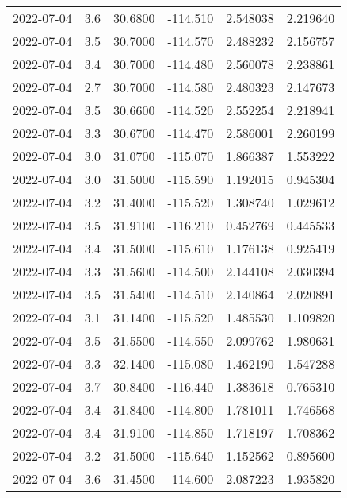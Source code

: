 \begin{tabular}{lrrrrr}
2022-07-04 &       3.6 &  30.6800 &  -114.510 &         2.548038 &         2.219640 \\
2022-07-04 &       3.5 &  30.7000 &  -114.570 &         2.488232 &         2.156757 \\
2022-07-04 &       3.4 &  30.7000 &  -114.480 &         2.560078 &         2.238861 \\
2022-07-04 &       2.7 &  30.7000 &  -114.580 &         2.480323 &         2.147673 \\
2022-07-04 &       3.5 &  30.6600 &  -114.520 &         2.552254 &         2.218941 \\
2022-07-04 &       3.3 &  30.6700 &  -114.470 &         2.586001 &         2.260199 \\
2022-07-04 &       3.0 &  31.0700 &  -115.070 &         1.866387 &         1.553222 \\
2022-07-04 &       3.0 &  31.5000 &  -115.590 &         1.192015 &         0.945304 \\
2022-07-04 &       3.2 &  31.4000 &  -115.520 &         1.308740 &         1.029612 \\
2022-07-04 &       3.5 &  31.9100 &  -116.210 &         0.452769 &         0.445533 \\
2022-07-04 &       3.4 &  31.5000 &  -115.610 &         1.176138 &         0.925419 \\
2022-07-04 &       3.3 &  31.5600 &  -114.500 &         2.144108 &         2.030394 \\
2022-07-04 &       3.5 &  31.5400 &  -114.510 &         2.140864 &         2.020891 \\
2022-07-04 &       3.1 &  31.1400 &  -115.520 &         1.485530 &         1.109820 \\
2022-07-04 &       3.5 &  31.5500 &  -114.550 &         2.099762 &         1.980631 \\
2022-07-04 &       3.3 &  32.1400 &  -115.080 &         1.462190 &         1.547288 \\
2022-07-04 &       3.7 &  30.8400 &  -116.440 &         1.383618 &         0.765310 \\
2022-07-04 &       3.4 &  31.8400 &  -114.800 &         1.781011 &         1.746568 \\
2022-07-04 &       3.4 &  31.9100 &  -114.850 &         1.718197 &         1.708362 \\
2022-07-04 &       3.2 &  31.5000 &  -115.640 &         1.152562 &         0.895600 \\
2022-07-04 &       3.6 &  31.4500 &  -114.600 &         2.087223 &         1.935820 \\

\end{tabular}
